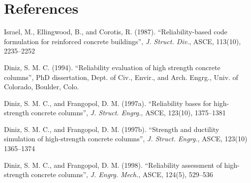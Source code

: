 \documentclass[a4paper]{article}
\begin{document}
\section*{References}
\begin{list}{}{\setlength{\leftmargin}{0pt}}

\item Israel, M., Ellingwood, B., and Corotis, R. (1987). ``Reliability-based
code formulation for reinforced concrete buildings'', {\it J. Struct. Div.},
ASCE, 113(10), 2235--2252

\item Diniz, S. M. C. (1994). ``Reliability evaluation of high strength concrete columns'',
PhD dissertation, Dept. of Civ., Envir., and Arch. Engrg., Univ. of Colorado, Boulder, Colo.

\item Diniz, S. M. C., and Frangopol, D. M. (1997a). ``Reliability bases for high-strength
concrete columns'', {\it J. Struct. Engrg.}, ASCE, 123(10), 1375--1381

\item Diniz, S. M. C., and Frangopol, D. M. (1997b). ``Strength and ductility simulation of
high-strength concrete columns'', {\it J. Struct. Engrg.}, ASCE, 123(10) 1365--1374

\item Diniz, S. M. C., and Frangopol, D. M. (1998). ``Reliability assessment 
of high-strength concrete columns'', {\it J. Engrg. Mech.}, ASCE, 124(5), 529--536

\end{list}
\end{document}
